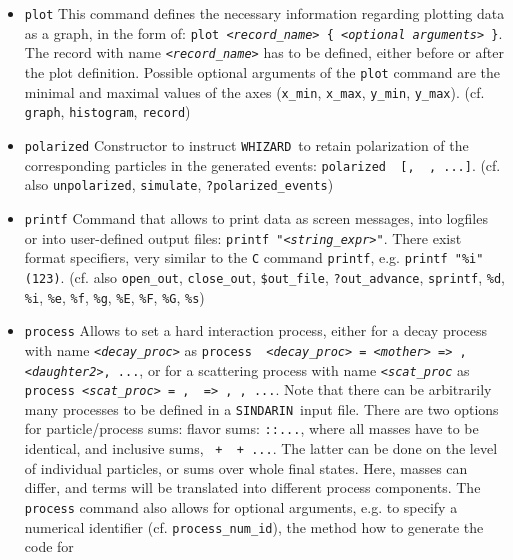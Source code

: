 \documentclass[12pt]{book}
\newcommand{\ttt}[1]{\texttt{#1}}
\newcommand{\whizard}{\ttt{WHIZARD}}
\newcommand{\sindarin}{\ttt{SINDARIN}}
\begin{document}
\begin{itemize}
\item
\ttt{plot} \newline
This command defines the necessary information regarding plotting data
as a graph, in the form of: \ttt{plot {\em <record\_name>} \{ {\em <optional
arguments>} \}}. The record with name \ttt{{\em <record\_name>}} has to be
defined, either before or after the plot definition. Possible optional
arguments of the \ttt{plot} command are the minimal and maximal values
of the axes (\ttt{x\_min}, \ttt{x\_max}, \ttt{y\_min}, \ttt{y\_max}).
(cf. \ttt{graph}, \ttt{histogram}, \ttt{record})
\item
\ttt{polarized} \newline
Constructor to instruct \whizard\ to retain polarization of the
corresponding particles in the generated events: \ttt{polarized {\em <prt1>}
  [, {\em <prt2>} , ...]}. (cf. also \ttt{unpolarized}, \ttt{simulate},
\ttt{?polarized\_events})
\item
\ttt{printf} \newline
Command that allows to print data as screen messages, into logfiles or
into user-defined output files: \ttt{printf "{\em <string\_expr>}"}. There
exist format specifiers, very similar to the \ttt{C} command
\ttt{printf}, e.g. \ttt{printf "\%i" (123)}. (cf. also
\ttt{open\_out}, \ttt{close\_out}, \ttt{\$out\_file},
\ttt{?out\_advance}, \ttt{sprintf}, \ttt{\%d}, \ttt{\%i}, \ttt{\%e},
\ttt{\%f}, \ttt{\%g}, \ttt{\%E}, \ttt{\%F}, \ttt{\%G}, \ttt{\%s})
\item
\ttt{process} \newline
Allows to set a hard interaction process, either for a decay process
with name \ttt{{\em <decay\_proc>}} as \ttt{process {\em
<decay\_proc>} = {\em <mother>} => {\em <daughter1>}, {\em
<daughter2>}, ...}, or for a scattering process
with name \ttt{{\em <scat\_proc}} as \ttt{process {\em <scat\_proc>} =
{\em <in1>}, {\em <in2>} => {\em <out1>}, {\em <out2>}, ...}. Note
that there can be arbitrarily many processes to be defined in a
\sindarin\ input file. There are two options for particle/process sums: flavor sums:
\ttt{{\em <prt1>}:{\em <prt2>}:...}, where all masses have to be identical, and
inclusive sums, \ttt{{\em <prt1>} + {\em <prt2>} + ...}. The latter can be done on
the level of individual particles, or sums over whole final
states. Here, masses can differ, and terms will be translated into
different process components. The \ttt{process} command also allows for
optional arguments, e.g. to specify a numerical identifier
(cf. \ttt{process\_num\_id}), the method how to generate the code for

\end{itemize}
\end{document}
